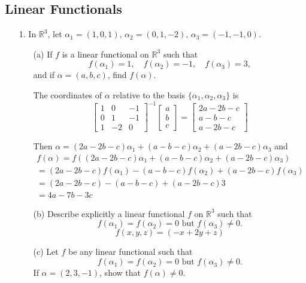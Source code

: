 \documentclass{article}
\begin{document}
\subsection{Linear Functionals}
\begin{enumerate}[listparindent=\parindent]

\item[1.] In \(\mathbb{R}^3\), let \(\alpha_1 = (1, 0, 1),\, \alpha_2 = (0, 1, -2),\, \alpha_3 = (-1, -1, 0)\).
    \begin{enumerate}[listparindent=\parindent]
        \item[(a)] If \(f\) is a linear functional on \(\mathbb{R}^3\) such that
            \[ f(\alpha_1) = 1,\quad f(\alpha_2) = -1,\quad f(\alpha_3) = 3, \]
            and if \(\alpha = (a, b, c)\), find \(f(\alpha)\).

            The coordinates of \(\alpha\) relative to the basis \(\{\alpha_1, \alpha_2, \alpha_3\}\) is
            \[
                \begin{bmatrix} 1 & 0 & -1 \\ 0 & 1 & -1 \\ 1 & -2 & 0\end{bmatrix}^{-1} \begin{bmatrix} a \\ b \\ c \end{bmatrix}
                = \begin{bmatrix} 2a - 2b - c \\ a - b - c \\ a - 2b - c \end{bmatrix}
            \]

            Then \(\alpha = (2a - 2b - c)\alpha_1 + (a - b - c)\alpha_2 + (a - 2b - c)\alpha_3\) and
            \begin{gather*}
                f(\alpha) = f((2a - 2b - c)\alpha_1 + (a - b - c)\alpha_2 + (a - 2b - c)\alpha_3) \\
                = (2a - 2b - c)f(\alpha_1) - (a - b - c)f(\alpha_2) + (a - 2b - c)f(\alpha_3) \\
                = (2a - 2b - c) - (a - b - c) + (a - 2b - c)3 \\
                = 4a - 7b - 3c
            \end{gather*}
        \item[(b)] Describe explicitly a linear functional \(f\) on \(\mathbb{R}^3\) such that
            \[ f(\alpha_1) = f(\alpha_2) = 0 \text{ but } f(\alpha_3) \neq 0. \]
            \[ f(x, y, z) = (-x + 2y + z)\]
        \item[(c)] Let \(f\) be any linear functional such that
            \[ f(\alpha_1) = f(\alpha_2) = 0 \text{ but } f(\alpha_3) \neq 0. \]
            If \(\alpha = (2, 3, -1)\), show that \(f(\alpha) \neq 0\).


\end{enumerate}
\end{enumerate}
\end{document}
